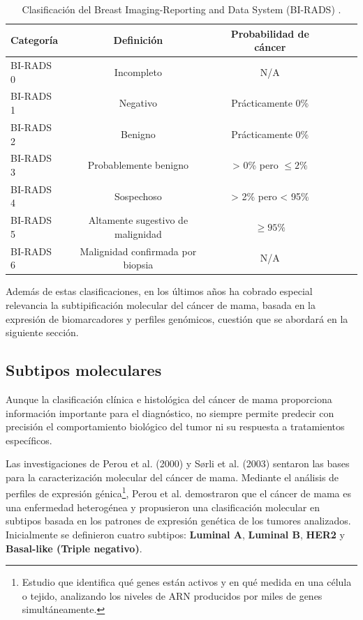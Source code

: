 \documentclass[a4paper,10pt]{book}
\begin{document}
\begin{table}[h!]
	\caption[Breast Imaging-Reporting and Data System (BI-RADS)]{Clasificación del Breast Imaging-Reporting and Data System (BI-RADS) \cite{noauthor_bi-rads_2025}.}
	\centering
	\begin{tabular}{lccccc}
		\toprule
		\textbf{Categoría} & \textbf{Definición} & \textbf{Probabilidad de cáncer}\\
		\midrule
		BI-RADS 0        & Incompleto                         & N/A \\
		BI-RADS 1        & Negativo                           & Prácticamente 0\% \\
        BI-RADS 2        & Benigno                             & Prácticamente 0\%  \\
        BI-RADS 3        & Probablemente benigno               & > 0\% pero $\leq 2\%$ \\
        BI-RADS 4        & Sospechoso                          & > 2\% pero < 95\% \\
        BI-RADS 5        & Altamente sugestivo de malignidad   & $\geq 95\%$ \\
        BI-RADS 6        & Malignidad confirmada por biopsia   & N/A \\
		\bottomrule
	\end{tabular}
	\label{tab:birads_table}
\end{table}

Además de estas clasificaciones, en los últimos años ha cobrado especial relevancia la subtipificación molecular del cáncer de mama, basada en la expresión de biomarcadores y perfiles genómicos, cuestión que se abordará en la siguiente sección.


\subsection{Subtipos moleculares}

Aunque la clasificación clínica e histológica del cáncer de mama proporciona información importante para el diagnóstico, no siempre permite predecir con precisión el comportamiento biológico del tumor ni su respuesta a tratamientos específicos.

Las investigaciones de Perou et al. (2000) \cite{perou_molecular_2000} y Sørli et al. (2003) \cite{sorlie_repeated_2003} sentaron las bases para la caracterización molecular del cáncer de mama. Mediante el análisis de perfiles de expresión génica\footnote{Estudio que identifica qué genes están activos y en qué medida en una célula o tejido, analizando los niveles de ARN producidos por miles de genes simultáneamente.}, Perou et al. demostraron que el cáncer de mama es una enfermedad heterogénea y propusieron una clasificación molecular en subtipos basada en los patrones de expresión genética de los tumores analizados. Inicialmente se definieron cuatro subtipos: \textbf{Luminal A}, \textbf{Luminal B}, \textbf{HER2} y \textbf{Basal-like (Triple negativo)}.
\end{document}
